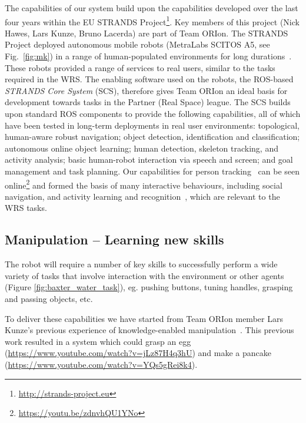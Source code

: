 \documentclass[runningheads,a4paper]{llncs}
\newcommand{\teamori}{Team ORIon}
\begin{document}
The capabilities of our system build upon the capabilities developed over the last four years within the EU STRANDS Project\footnote{\url{http://strands-project.eu}}. Key members of this project (Nick Hawes, Lars Kunze, Bruno Lacerda) are part of \teamori. The STRANDS Project deployed autonomous mobile robots (MetraLabs SCITOS A5, see Fig.~\ref{fig:mk}) in a range of human-populated environments for long durations~\cite{strands@ram}. These robots provided a range of services to real users, similar to the tasks required in the WRS. The enabling software used on the robots, the ROS-based \emph{STRANDS Core System} (SCS), therefore gives \teamori{} an ideal basis for development towards tasks in the Partner (Real Space) league. 
The SCS builds upon standard ROS components to provide the following capabilities, all of which have been tested in long-term deployments in real user environments: topological, human-aware robust navigation; object detection, identification and classification; autonomous online object learning; human detection, skeleton tracking, and activity analysis; basic human-robot interaction via speech and screen; and goal management and task planning. Our capabilities for person tracking~\cite{dondrup2015tracker} can be seen online\footnote{\url{https://youtu.be/zdnvhQU1YNo}} and formed the basis of many interactive behaviours, including social navigation, and activity learning and recognition~\cite{duckworth_aamas2016}, which are relevant to the WRS tasks. 


\subsection{Manipulation -- Learning new skills}

The robot will require a number of key skills to successfully perform a wide
variety of tasks that involve interaction with the environment or other
agents (Figure \ref{fig:baxter_water_task}), eg. pushing buttons, tuning handles, grasping and passing objects, etc. 

To deliver these capabilities we have started from \teamori{} member Lars Kunze's previous experience of knowledge-enabled manipulation~\cite{kunze15aij}. This previous work resulted in a system which could grasp an egg (\url{https://www.youtube.com/watch?v=jLz87H4q3hU}) and make a pancake (\url{https://www.youtube.com/watch?v=YQs5gRei8k4}). 
\end{document}
